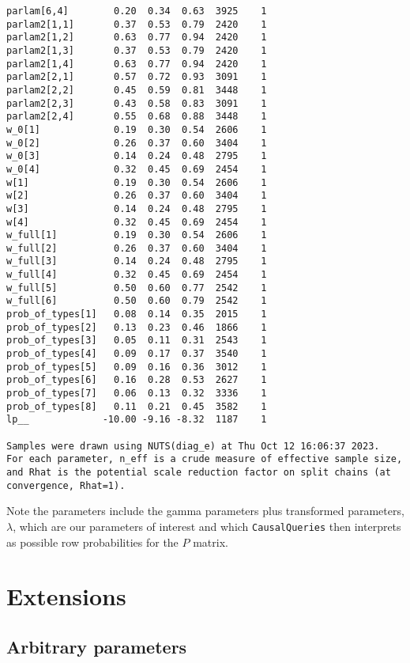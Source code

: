 \documentclass[
  12pt,
]{book}
\begin{document}
\begin{verbatim}
parlam[6,4]        0.20  0.34  0.63  3925    1
parlam2[1,1]       0.37  0.53  0.79  2420    1
parlam2[1,2]       0.63  0.77  0.94  2420    1
parlam2[1,3]       0.37  0.53  0.79  2420    1
parlam2[1,4]       0.63  0.77  0.94  2420    1
parlam2[2,1]       0.57  0.72  0.93  3091    1
parlam2[2,2]       0.45  0.59  0.81  3448    1
parlam2[2,3]       0.43  0.58  0.83  3091    1
parlam2[2,4]       0.55  0.68  0.88  3448    1
w_0[1]             0.19  0.30  0.54  2606    1
w_0[2]             0.26  0.37  0.60  3404    1
w_0[3]             0.14  0.24  0.48  2795    1
w_0[4]             0.32  0.45  0.69  2454    1
w[1]               0.19  0.30  0.54  2606    1
w[2]               0.26  0.37  0.60  3404    1
w[3]               0.14  0.24  0.48  2795    1
w[4]               0.32  0.45  0.69  2454    1
w_full[1]          0.19  0.30  0.54  2606    1
w_full[2]          0.26  0.37  0.60  3404    1
w_full[3]          0.14  0.24  0.48  2795    1
w_full[4]          0.32  0.45  0.69  2454    1
w_full[5]          0.50  0.60  0.77  2542    1
w_full[6]          0.50  0.60  0.79  2542    1
prob_of_types[1]   0.08  0.14  0.35  2015    1
prob_of_types[2]   0.13  0.23  0.46  1866    1
prob_of_types[3]   0.05  0.11  0.31  2543    1
prob_of_types[4]   0.09  0.17  0.37  3540    1
prob_of_types[5]   0.09  0.16  0.36  3012    1
prob_of_types[6]   0.16  0.28  0.53  2627    1
prob_of_types[7]   0.06  0.13  0.32  3336    1
prob_of_types[8]   0.11  0.21  0.45  3582    1
lp__             -10.00 -9.16 -8.32  1187    1

Samples were drawn using NUTS(diag_e) at Thu Oct 12 16:06:37 2023.
For each parameter, n_eff is a crude measure of effective sample size,
and Rhat is the potential scale reduction factor on split chains (at 
convergence, Rhat=1).
\end{verbatim}

Note the parameters include the gamma parameters plus transformed parameters, \(\lambda\), which are our parameters of interest and which \texttt{CausalQueries} then interprets as possible row probabilities for the \(P\) matrix.

\hypertarget{extensions}{%
\section{Extensions}\label{extensions}}

\hypertarget{arbitrary-parameters}{%
\subsection{Arbitrary parameters}\label{arbitrary-parameters}}
\end{document}
